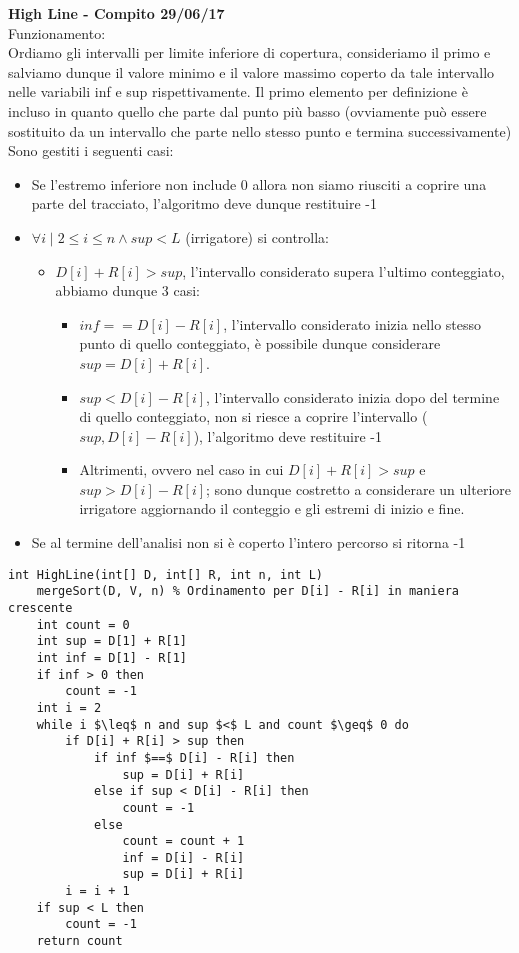 \documentclass[../cheatSheetAlgoritmi.tex]{subfiles}
\begin{document}
\textbf{High Line - Compito 29/06/17}\\
Funzionamento: \\
Ordiamo gli intervalli per limite inferiore di copertura, consideriamo il primo e salviamo dunque il valore minimo e il valore massimo coperto da tale intervallo nelle variabili inf e sup rispettivamente. Il primo elemento per definizione è incluso in quanto quello che parte dal punto più basso (ovviamente può essere sostituito da un intervallo che parte nello stesso punto e termina successivamente)\\
Sono gestiti i seguenti casi: 
\begin{itemize}
    \item Se l'estremo inferiore non include 0 allora non siamo riusciti a coprire una parte del tracciato, l'algoritmo deve dunque restituire -1
    \item $\forall i \mid 2 \leq i \leq n \land sup < L$ (irrigatore) si controlla:
    \begin{itemize}
        \item $D[i] + R[i] > sup$, l'intervallo considerato supera l'ultimo conteggiato, abbiamo dunque 3 casi:
        \begin{itemize}
            \item $inf == D[i] - R[i]$, l'intervallo considerato inizia nello stesso punto di quello conteggiato, è possibile dunque considerare $sup = D[i] + R[i]$.
            \item $sup < D[i] - R[i]$, l'intervallo considerato inizia dopo del termine di quello conteggiato, non si riesce a coprire l'intervallo ($sup, D[i] - R[i]$), l'algoritmo deve restituire -1
            \item Altrimenti, ovvero nel caso in cui $D[i] + R[i] > sup$ e $sup > D[i] - R[i]$; sono dunque costretto a considerare un ulteriore irrigatore aggiornando il conteggio e gli estremi di inizio e fine.
        \end{itemize}
    \end{itemize}
    \item Se al termine dell'analisi non si è coperto l'intero percorso si ritorna -1
\end{itemize}
\begin{lstlisting}[caption=HighLine]
int HighLine(int[] D, int[] R, int n, int L)
    mergeSort(D, V, n) % Ordinamento per D[i] - R[i] in maniera crescente
    int count = 0
    int sup = D[1] + R[1]
    int inf = D[1] - R[1]
    if inf > 0 then
        count = -1
    int i = 2 
    while i $\leq$ n and sup $<$ L and count $\geq$ 0 do 
        if D[i] + R[i] > sup then
            if inf $==$ D[i] - R[i] then
                sup = D[i] + R[i]
            else if sup < D[i] - R[i] then
                count = -1
            else 
                count = count + 1
                inf = D[i] - R[i]
                sup = D[i] + R[i]
        i = i + 1
    if sup < L then
        count = -1
    return count
\end{lstlisting}
\end{document}
